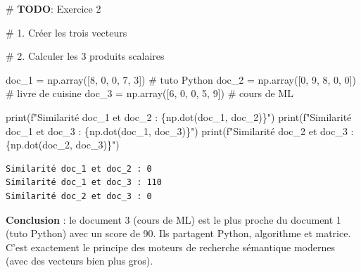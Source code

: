 \documentclass[
  french,
  11pt,
  a4paper,
]{scrbook}
\newenvironment{Shaded}{}{}
\newcommand{\AlertTok}[1]{\textcolor[rgb]{1.00,0.33,0.33}{\textbf{#1}}}
\newcommand{\BuiltInTok}[1]{\textcolor[rgb]{0.84,0.23,0.29}{#1}}
\newcommand{\CommentTok}[1]{\textcolor[rgb]{0.42,0.45,0.49}{#1}}
\newcommand{\DecValTok}[1]{\textcolor[rgb]{0.00,0.36,0.77}{#1}}
\newcommand{\NormalTok}[1]{\textcolor[rgb]{0.14,0.16,0.18}{#1}}
\newcommand{\OperatorTok}[1]{\textcolor[rgb]{0.14,0.16,0.18}{#1}}
\newcommand{\SpecialCharTok}[1]{\textcolor[rgb]{0.00,0.36,0.77}{#1}}
\newcommand{\SpecialStringTok}[1]{\textcolor[rgb]{0.01,0.18,0.38}{#1}}
\begin{document}
\begin{Shaded}
\begin{Highlighting}[]
\CommentTok{\# }\AlertTok{TODO}\CommentTok{: Exercice 2}

\CommentTok{\# 1. Créer les trois vecteurs}


\CommentTok{\# 2. Calculer les 3 produits scalaires}
\end{Highlighting}
\end{Shaded}

\begin{tcolorbox}[enhanced jigsaw, arc=.35mm, bottomrule=.15mm, bottomtitle=1mm, breakable, colback=white, colbacktitle=quarto-callout-tip-color!10!white, colframe=quarto-callout-tip-color-frame, coltitle=black, left=2mm, leftrule=.75mm, opacityback=0, opacitybacktitle=0.6, rightrule=.15mm, title=\textcolor{quarto-callout-tip-color}{\faLightbulb}\hspace{0.5em}{✅ Voir la correction}, titlerule=0mm, toprule=.15mm, toptitle=1mm]

\begin{Shaded}
\begin{Highlighting}[]
\NormalTok{doc\_1 }\OperatorTok{=}\NormalTok{ np.array([}\DecValTok{8}\NormalTok{, }\DecValTok{0}\NormalTok{, }\DecValTok{0}\NormalTok{, }\DecValTok{7}\NormalTok{, }\DecValTok{3}\NormalTok{])  }\CommentTok{\# tuto Python}
\NormalTok{doc\_2 }\OperatorTok{=}\NormalTok{ np.array([}\DecValTok{0}\NormalTok{, }\DecValTok{9}\NormalTok{, }\DecValTok{8}\NormalTok{, }\DecValTok{0}\NormalTok{, }\DecValTok{0}\NormalTok{])  }\CommentTok{\# livre de cuisine}
\NormalTok{doc\_3 }\OperatorTok{=}\NormalTok{ np.array([}\DecValTok{6}\NormalTok{, }\DecValTok{0}\NormalTok{, }\DecValTok{0}\NormalTok{, }\DecValTok{5}\NormalTok{, }\DecValTok{9}\NormalTok{])  }\CommentTok{\# cours de ML}

\BuiltInTok{print}\NormalTok{(}\SpecialStringTok{f"Similarité doc\_1 et doc\_2 : }\SpecialCharTok{\{}\NormalTok{np}\SpecialCharTok{.}\NormalTok{dot(doc\_1, doc\_2)}\SpecialCharTok{\}}\SpecialStringTok{"}\NormalTok{)}
\BuiltInTok{print}\NormalTok{(}\SpecialStringTok{f"Similarité doc\_1 et doc\_3 : }\SpecialCharTok{\{}\NormalTok{np}\SpecialCharTok{.}\NormalTok{dot(doc\_1, doc\_3)}\SpecialCharTok{\}}\SpecialStringTok{"}\NormalTok{)}
\BuiltInTok{print}\NormalTok{(}\SpecialStringTok{f"Similarité doc\_2 et doc\_3 : }\SpecialCharTok{\{}\NormalTok{np}\SpecialCharTok{.}\NormalTok{dot(doc\_2, doc\_3)}\SpecialCharTok{\}}\SpecialStringTok{"}\NormalTok{)}
\end{Highlighting}
\end{Shaded}

\begin{verbatim}
Similarité doc_1 et doc_2 : 0
Similarité doc_1 et doc_3 : 110
Similarité doc_2 et doc_3 : 0
\end{verbatim}

\textbf{Conclusion} : le document 3 (cours de ML) est le plus proche du
document 1 (tuto Python) avec un score de 90. Ils partagent Python,
algorithme et matrice. C'est exactement le principe des moteurs de
recherche sémantique modernes (avec des vecteurs bien plus gros).

\end{tcolorbox}
\end{document}
